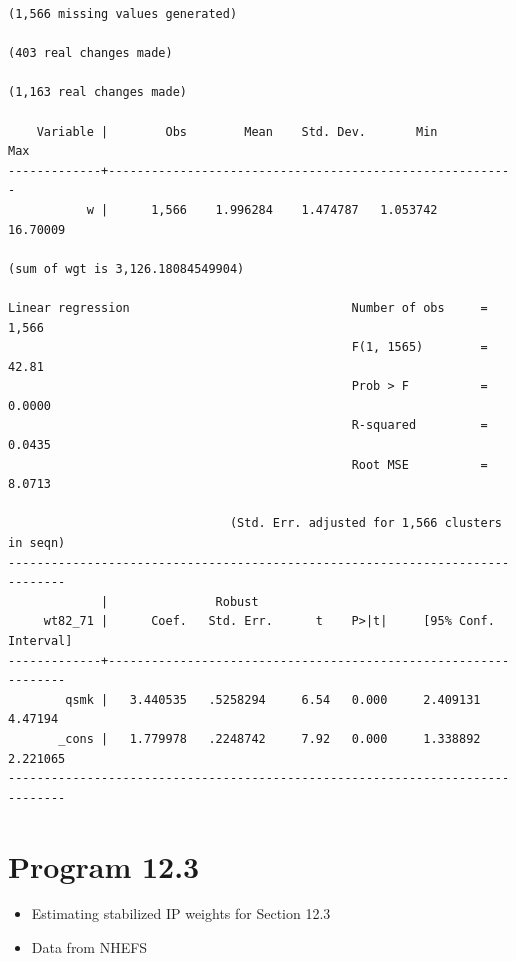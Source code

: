 \documentclass[
  10pt,
]{book}
\providecommand{\tightlist}{%
  \setlength{\itemsep}{0pt}\setlength{\parskip}{0pt}}
\begin{document}
\begin{verbatim}
(1,566 missing values generated)

(403 real changes made)

(1,163 real changes made)

    Variable |        Obs        Mean    Std. Dev.       Min        Max
-------------+---------------------------------------------------------
           w |      1,566    1.996284    1.474787   1.053742   16.70009

(sum of wgt is 3,126.18084549904)

Linear regression                               Number of obs     =      1,566
                                                F(1, 1565)        =      42.81
                                                Prob > F          =     0.0000
                                                R-squared         =     0.0435
                                                Root MSE          =     8.0713

                               (Std. Err. adjusted for 1,566 clusters in seqn)
------------------------------------------------------------------------------
             |               Robust
     wt82_71 |      Coef.   Std. Err.      t    P>|t|     [95% Conf. Interval]
-------------+----------------------------------------------------------------
        qsmk |   3.440535   .5258294     6.54   0.000     2.409131     4.47194
       _cons |   1.779978   .2248742     7.92   0.000     1.338892    2.221065
------------------------------------------------------------------------------
\end{verbatim}

\hypertarget{program-12.3}{%
\section{Program 12.3}\label{program-12.3}}

\begin{itemize}
\tightlist
\item
  Estimating stabilized IP weights for Section 12.3
\item
  Data from NHEFS
\end{itemize}
\end{document}
